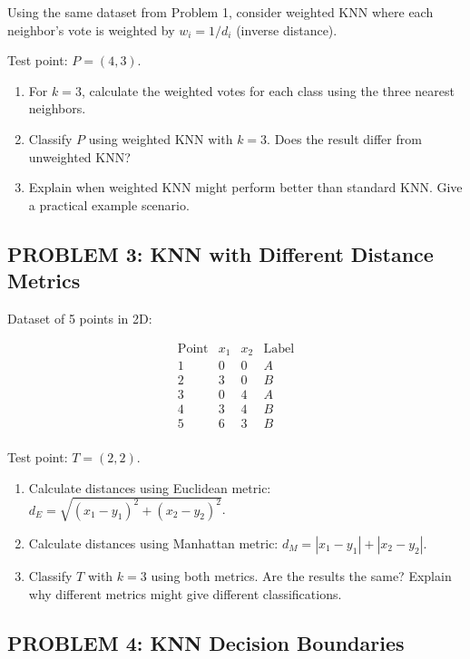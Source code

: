 \documentclass[12pt]{article}
\begin{document}
Using the same dataset from Problem 1, consider weighted KNN where each neighbor's vote is weighted by \(w_i = 1/d_i\) (inverse distance).

Test point: \(P = (4, 3)\).

\begin{enumerate}
\item[(a)] For \(k = 3\), calculate the weighted votes for each class using the three nearest neighbors.
\item[(b)] Classify \(P\) using weighted KNN with \(k = 3\). Does the result differ from unweighted KNN?
\item[(c)] Explain when weighted KNN might perform better than standard KNN. Give a practical example scenario.
\end{enumerate}

\subsection*{PROBLEM 3: KNN with Different Distance Metrics}

Dataset of 5 points in 2D:

\[\begin{array}{c|cc|c}
\text{Point} & x_1 & x_2 & \text{Label} \\
\hline
1 & 0 & 0 & A \\
2 & 3 & 0 & B \\
3 & 0 & 4 & A \\
4 & 3 & 4 & B \\
5 & 6 & 3 & B \\
\end{array}\]

Test point: \(T = (2, 2)\).

\begin{enumerate}
\item[(a)] Calculate distances using Euclidean metric: \(d_E = \sqrt{(x_1-y_1)^2 + (x_2-y_2)^2}\).
\item[(b)] Calculate distances using Manhattan metric: \(d_M = |x_1-y_1| + |x_2-y_2|\).
\item[(c)] Classify \(T\) with \(k=3\) using both metrics. Are the results the same? Explain why different metrics might give different classifications.
\end{enumerate}

\subsection*{PROBLEM 4: KNN Decision Boundaries}
\end{document}
